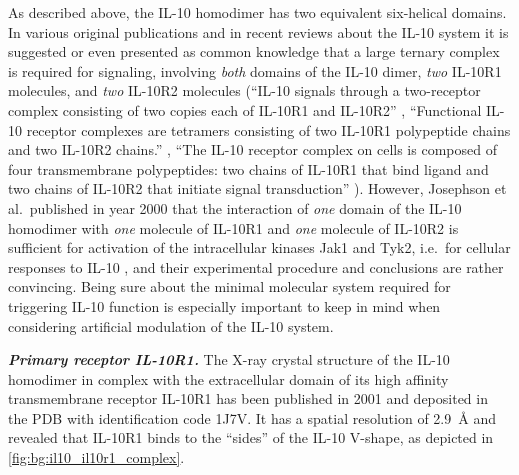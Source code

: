 As described above, the IL-10 homodimer has two equivalent six-helical domains.
In various original publications and in recent reviews about the IL-10 system it
is suggested or even presented as common knowledge that a large ternary complex
is required for signaling, involving \textit{both} domains of the IL-10 dimer,
\textit{two} IL-10R1 molecules, and \textit{two} IL-10R2 molecules
(\enquote{IL-10 signals through a two-receptor complex consisting of two copies
each of IL-10R1 and IL-10R2} \cite{mosser_il10_newperspectives_2008},
\enquote{Functional IL-10 receptor complexes are tetramers consisting of two
IL-10R1 polypeptide chains and two IL-10R2 chains.}
\cite{donnelly_finbloom_il10_1999}, \enquote{The IL-10 receptor complex on cells
is composed of four transmembrane polypeptides: two chains of IL-10R1 that bind
ligand and two chains of IL-10R2 that initiate signal transduction}
\cite{pestka_2004_il10_receptors_review}). However, Josephson et al.\ published
in year 2000 that the interaction of \textit{one} domain of the IL-10 homodimer
with \textit{one} molecule of IL-10R1 and \textit{one} molecule of IL-10R2 is
sufficient for activation of the intracellular kinases Jak1 and Tyk2, i.e.\ for
cellular responses to IL-10 \cite{il10_monomer_2000}, and their experimental
procedure and conclusions are rather convincing. Being sure about the minimal
molecular system required for triggering IL-10 function is especially important
to keep in mind when considering artificial modulation of the IL-10 system.

\vspace{0.5cm}
\textit{\textbf{Primary receptor IL-10R1.}} The X-ray crystal structure of the
IL-10 homodimer in complex with the extracellular domain of its high affinity
transmembrane receptor IL-10R1 has been published in 2001 \cite{Josephson2001}
and deposited in the PDB with identification code 1J7V. It has a spatial
resolution of \SI{2.9}{\angstrom} and revealed that IL-10R1 binds to the
\enquote{sides} of the IL-10 V-shape, as depicted in
\cref{fig:bg:il10_il10r1_complex}.

